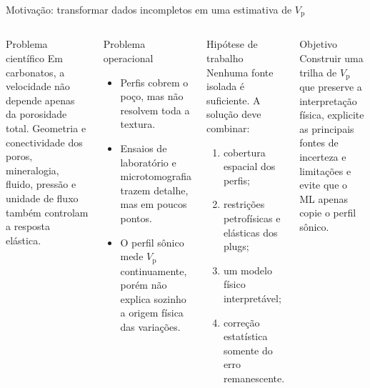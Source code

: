 \documentclass[aspectratio=169,10pt]{beamer}
\newcommand{\Vp}{\ensuremath{V_{\mathrm{p}}}}
\begin{document}
\begin{frame}{Motiva\c{c}\~ao: transformar dados incompletos em uma estimativa de \Vp{}}
  \footnotesize
  \begin{columns}[T,onlytextwidth]
    \begin{block}{Problema cient\'ifico}
      \scriptsize
      Em carbonatos, a velocidade n\~ao depende apenas da porosidade total.
      Geometria e conectividade dos poros, mineralogia, fluido, press\~ao e
      unidade de fluxo tamb\'em controlam a resposta el\'astica.
    \end{block}
    \begin{block}{Problema operacional}
      \scriptsize
      \begin{itemize}
        \item Perfis cobrem o po\c{c}o, mas n\~ao resolvem toda a textura.
        \item Ensaios de laborat\'orio e microtomografia trazem detalhe,
              mas em poucos pontos.
        \item O perfil s\^onico mede \Vp{} continuamente, por\'em n\~ao
              explica sozinho a origem f\'isica das varia\c{c}\~oes.
      \end{itemize}
    \end{block}
    \begin{exampleblock}{Hip\'otese de trabalho}
      \scriptsize
      Nenhuma fonte isolada \'e suficiente. A solu\c{c}\~ao deve combinar:
      \begin{enumerate}
        \item cobertura espacial dos perfis;
        \item restri\c{c}\~oes petrof\'isicas e el\'asticas dos plugs;
        \item um modelo f\'isico interpret\'avel;
        \item corre\c{c}\~ao estat\'istica somente do erro remanescente.
      \end{enumerate}
    \end{exampleblock}
    \vspace{0.06cm}
    \begin{block}{Objetivo}
      \scriptsize
      Construir uma trilha de \Vp{} que preserve a interpreta\c{c}\~ao
      f\'isica, explicite as principais fontes de incerteza e limita\c{c}\~oes
      e evite que o ML apenas copie o perfil s\^onico.
    \end{block}
  \end{columns}
\end{frame}
\end{document}
